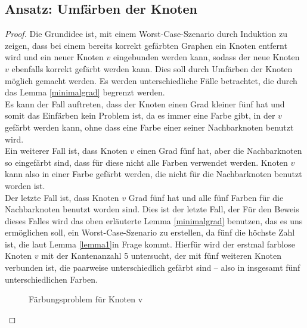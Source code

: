 \subsection{Ansatz: Umfärben der Knoten}\begin{proof}
Die Grundidee ist, mit einem Worst-Case-Szenario durch Induktion zu zeigen, dass bei einem bereits korrekt gefärbten Graphen ein Knoten entfernt wird und ein neuer Knoten $v$ eingebunden werden kann, sodass der neue Knoten $v$ ebenfalls korrekt gefärbt werden kann. Dies soll durch Umfärben der Knoten möglich gemacht werden. Es werden unterschiedliche Fälle betrachtet, die durch das Lemma \ref{minimalgrad} begrenzt werden.\\
Es kann der Fall auftreten, dass der Knoten einen Grad kleiner fünf hat und somit das Einfärben kein Problem ist, da es immer eine Farbe gibt, in der $v$ gefärbt werden kann, ohne dass eine Farbe einer seiner Nachbarknoten benutzt wird.
\\Ein weiterer Fall ist, dass Knoten $v$ einen Grad fünf hat, aber die Nachbarknoten so eingefärbt sind, dass für diese nicht alle Farben verwendet werden. Knoten $v$ kann also in einer Farbe gefärbt werden, die nicht für die Nachbarknoten benutzt worden ist.
\\Der letzte Fall ist, dass Knoten $v$ Grad fünf hat und alle fünf Farben für die Nachbarknoten benutzt worden sind. Dies ist der letzte Fall, der 
Für den Beweis dieses Falles wird das oben erläuterte Lemma \ref{minimalgrad} benutzen, das es uns ermöglichen soll, ein Worst-Case-Szenario zu erstellen, da fünf die höchste Zahl ist, die laut Lemma \ref{lemma1}in Frage kommt.
Hierfür wird der erstmal farblose Knoten $v$ mit der Kantenanzahl 5 untersucht, der mit fünf weiteren Knoten verbunden ist, die paarweise unterschiedlich gefärbt sind -- also in insgesamt fünf unterschiedlichen Farben.\\
\begin{figure}
\centering
{}
\caption{Färbungsproblem für Knoten v}
\label{graph2}
\end{figure}

\end{proof}
